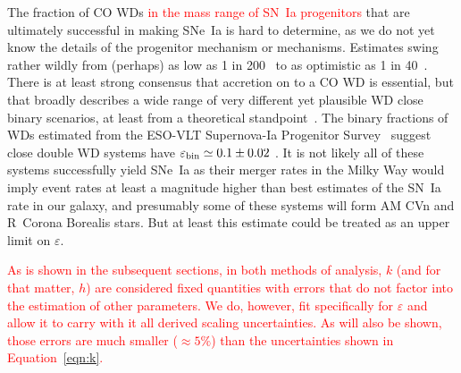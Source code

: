 \documentclass[apj, linenumbers]{aastex62}
\begin{document}
The fraction of CO WDs \textcolor{red}{in the mass range of SN~Ia progenitors} that are ultimately successful in making SNe~Ia is hard to determine, as we do not yet know the details of the progenitor mechanism or mechanisms. Estimates swing rather wildly from (perhaps) as low as 1 in 200~\citep{Breedt:2017rp} to as optimistic as 1 in 40~\citep{Maoz:2012}. There is at least strong consensus that accretion on to a CO WD is essential, but that broadly describes a wide range of very different yet plausible WD close binary scenarios, at least from a theoretical standpoint~\citep{Nelemans:2001hb,Nelemans:2001cs}. The binary fractions of WDs estimated from the ESO-VLT Supernova-Ia Progenitor Survey~\citep[SPY;][]{Napiwotzki:2007,Napiwotzki:2019ez} suggest close double WD systems have $\varepsilon_{\rm bin}\simeq0.1\pm0.02$ \citep{Maoz:2017zl}. It is not likely all of these systems successfully yield SNe~Ia as their merger rates in the Milky Way would imply event rates at least a magnitude higher than best estimates of the SN~Ia rate in our galaxy, and presumably some of these systems will form AM CVn and R~Corona Borealis stars. But at least this estimate could be treated as an upper limit on $\varepsilon$.

\textcolor{red}{As is shown in the subsequent sections, in both methods of analysis, $k$ (and for that matter, $h$) are considered fixed quantities with errors that do not factor into the estimation of other parameters. We do, however, fit specifically for $\varepsilon$ and allow it to carry with it all derived scaling uncertainties. As will also be shown, those errors are much smaller ($\approx5\%$) than the uncertainties shown in Equation~\ref{eqn:k}.}%
\end{document}
